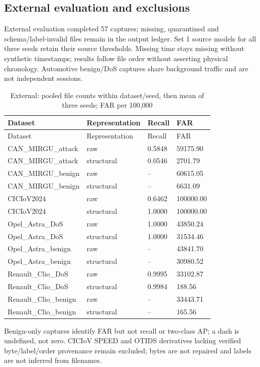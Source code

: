 \documentclass[12pt,a4paper,oneside,openany]{extbook}
\begin{document}
\subsection{External evaluation and exclusions}
External evaluation completed 57 captures; missing, quarantined and schema/label-invalid files remain in the output ledger. Set 1 source models for all three seeds retain their source thresholds. Missing time stays missing without synthetic timestamps; results follow file order without asserting physical chronology. Automotive benign/DoS captures share background traffic and are not independent sessions.
\begin{longtable}{P{4.4cm}P{3.1cm}P{2.0cm}P{2.4cm}}
\caption{External: pooled file counts within dataset/seed, then mean of three seeds; FAR per 100,000}\label{tab:extension-external}\\\toprule
Dataset & Representation & Recall & FAR\\\midrule\endfirsthead
\toprule
Dataset & Representation & Recall & FAR\\\midrule\endhead
CAN\_MIRGU\_attack & raw & 0.5848 & 59175.90\\
CAN\_MIRGU\_attack & structural & 0.0546 & 2701.79\\
CAN\_MIRGU\_benign & raw & -- & 60615.05\\
CAN\_MIRGU\_benign & structural & -- & 6631.09\\
CICIoV2024 & raw & 0.6462 & 100000.00\\
CICIoV2024 & structural & 1.0000 & 100000.00\\
Opel\_Astra\_DoS & raw & 1.0000 & 43850.24\\
Opel\_Astra\_DoS & structural & 1.0000 & 31534.46\\
Opel\_Astra\_benign & raw & -- & 43841.70\\
Opel\_Astra\_benign & structural & -- & 30980.52\\
Renault\_Clio\_DoS & raw & 0.9995 & 33102.87\\
Renault\_Clio\_DoS & structural & 0.9984 & 188.56\\
Renault\_Clio\_benign & raw & -- & 33443.71\\
Renault\_Clio\_benign & structural & -- & 165.56\\
\bottomrule\end{longtable}
Benign-only captures identify FAR but not recall or two-class AP; a dash is undefined, not zero. CICIoV SPEED and OTIDS derivatives lacking verified byte/label/order provenance remain excluded; bytes are not repaired and labels are not inferred from filenames.
\end{document}

